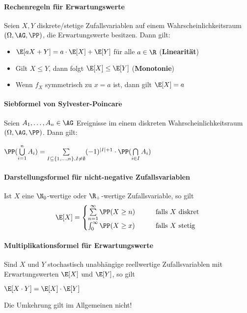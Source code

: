 \paragraph{Rechenregeln für Erwartungswerte}
Seien $X,Y$ diskrete/stetige Zufallsvariablen auf einem Wahrscheinlichkeitsraum $(\Omega,\AG,\PP)$, die Erwartungswerte besitzen.
Dann gilt:
\begin{itemize}
	\item $\E[aX+Y]=a\cdot\E[X]+\E[Y]$ für alle $a\in\R$ (\textbf{Linearität})
	\item Gilt $X\leq Y$, dann folgt $\E[X]\leq\E[Y]$ (\textbf{Monotonie})
	\item Wenn $f_X$ symmetrisch zu $x=a$ ist, dann gilt $\E[X]=a$
\end{itemize}

\paragraph{Siebformel von Sylvester-Poincar$\boldsymbol{\acute{e}}$}
Seien $A_1,\ldots,A_n\in\AG$ Ereignisse im einem diskreten Wahrscheinlichkeitsraum $(\Omega,\AG,\PP)$.
Dann gilt:
\begin{tightcenter}
	$\PP(\bigcup\limits_{i=1}^{n}A_i)=\sum\limits_{I\subseteq\{1,\ldots,n\}, I\neq\emptyset}(-1)^{|I|+1}\cdot\PP(\bigcap\limits_{i\in I}A_i)$
\end{tightcenter}

\paragraph{Darstellungsformel für nicht-negative Zufallsvariablen}
Ist $X$ eine $\N_0$-wertige oder $\R_+$-wertige Zufallsvariable, so gilt
\[   
\E[X]=
\begin{cases}
	\sum\limits_{n=1}^{\infty}\PP(X\geq n) & \qquad\text{falls $X$ diskret}\\
	\int_{0}^{\infty}\PP(X\geq x) & \qquad\text{falls $X$ stetig}
\end{cases}
\]

\paragraph{Multiplikationsformel für Erwartungswerte}
Sind $X$ und $Y$ stochastisch unabhängige reellwertige Zufallsvariablen mit Erwartungswerten $\E[X]$ und $\E[Y]$, so gilt
\begin{tightcenter}
	$\E[X\cdot Y]=\E[X]\cdot\E[Y]$
\end{tightcenter}
Die Umkehrung gilt im Allgemeinen nicht!